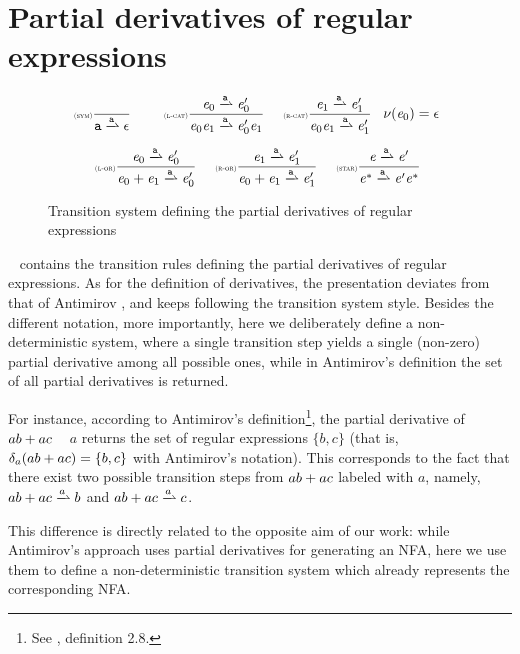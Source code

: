 \section{Partial derivatives of regular expressions}\label{sec:parDer}

\begin{figure}
 $$
  \begin{array}{c}
   \Rule{sym}{}{\sym\parDer{\sym}\eps}\quad
   \Rule{l-cat}{\re_0\parDer{\sym}\re'_0}{\re_0\catop\re_1\parDer{\sym}\re'_0\catop\re_1}{}\quad
   \Rule{r-cat}{\re_1\parDer{\sym}\re'_1}{\re_0\catop\re_1\parDer{\sym}\re'_1}{\hasEps{\re_0}=\eps} \\[4ex]
   \Rule{l-or}{\re_0\parDer{\sym}\re'_0}{\re_0\orop\re_1\parDer{\sym}\re'_0}{} \quad
   \Rule{r-or}{\re_1\parDer{\sym}\re'_1}{\re_0\orop\re_1\parDer{\sym}\re'_1}{} \quad
   \Rule{star}{\re\parDer{\sym}\re'}{\starop{\re}\parDer{\sym}\re'\catop\starop{\re}}{}
  \end{array}
 $$
 \caption{Transition system defining the partial derivatives of regular expressions}
 \label{fig:parDer}
\end{figure}

~ contains the transition rules defining the partial derivatives of regular expressions.
As for the definition of derivatives, the presentation deviates from that of Antimirov \cite{Antimirov96}, and keeps following the transition system style. Besides the different notation, more importantly, here we deliberately define a non-deterministic system, where a single transition step yields a single (non-zero) partial derivative among all possible ones, while in Antimirov's definition the set of all partial derivatives is returned.

For instance, according to Antimirov's definition\footnote{See \cite{Antimirov96}, definition 2.8.},
the partial derivative of $ab \mathbin{+} ac$ \wrt~ $a$ returns the set of regular expressions $\{b,c\}$ (that is, $\delta_a(ab \mathbin{+} ac)=\{b,c\}$ with Antimirov's notation). This corresponds to the fact that there exist two possible transition steps from $ab \mathbin{+} ac$ labeled with $a$, namely,
$ab \orop ac\parDer{a}b$ and $ab \orop ac\parDer{a}c$.

This difference is directly related to the opposite aim of our work: while Antimirov's approach uses partial derivatives for generating an NFA, here
we use them to define a non-deterministic transition system which already represents the corresponding NFA.


